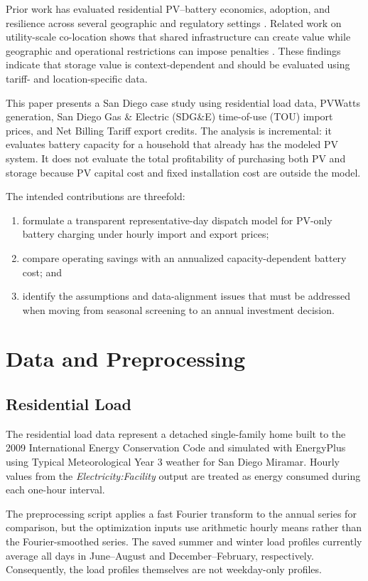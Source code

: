 \documentclass[journal]{IEEEtran}
\begin{document}
Prior work has evaluated residential PV--battery economics, adoption, and resilience across several geographic and regulatory settings \cite{bagalini2019solar,tervo2018battery,bollinger2023valuing,sun2025solar,baik2024resilience}. Related work on utility-scale co-location shows that shared infrastructure can create value while geographic and operational restrictions can impose penalties \cite{gorman2022coupled}. These findings indicate that storage value is context-dependent and should be evaluated using tariff- and location-specific data.

This paper presents a San Diego case study using residential load data, PVWatts generation, San Diego Gas \& Electric (SDG\&E) time-of-use (TOU) import prices, and Net Billing Tariff export credits. The analysis is incremental: it evaluates battery capacity for a household that already has the modeled PV system. It does not evaluate the total profitability of purchasing both PV and storage because PV capital cost and fixed installation cost are outside the model.

The intended contributions are threefold:
\begin{enumerate}
    \item formulate a transparent representative-day dispatch model for PV-only battery charging under hourly import and export prices;
    \item compare operating savings with an annualized capacity-dependent battery cost; and
    \item identify the assumptions and data-alignment issues that must be addressed when moving from seasonal screening to an annual investment decision.
\end{enumerate}

\section{Data and Preprocessing}
\subsection{Residential Load}
The residential load data represent a detached single-family home built to the 2009 International Energy Conservation Code and simulated with EnergyPlus using Typical Meteorological Year 3 weather for San Diego Miramar. Hourly values from the \emph{Electricity:Facility} output are treated as energy consumed during each one-hour interval.

The preprocessing script applies a fast Fourier transform to the annual series for comparison, but the optimization inputs use arithmetic hourly means rather than the Fourier-smoothed series. The saved summer and winter load profiles currently average all days in June--August and December--February, respectively. Consequently, the load profiles themselves are not weekday-only profiles.
\end{document}
